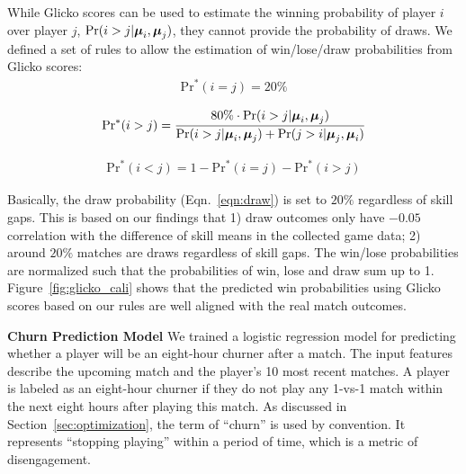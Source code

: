 
While Glicko scores can be used to estimate the winning probability of player $i$ over player $j$, $\Pr(i > j | \boldsymbol{\mu}_i, \boldsymbol{\mu}_j)$, they cannot provide the probability of draws. We defined a set of rules to allow the estimation of win/lose/draw probabilities from Glicko scores:
\begin{align}\label{eqn:draw}
\text{Pr}^*(i=j) = 20\%
\end{align}

\begin{align}
\text{Pr}^*(i>j)  = \frac{80\% \cdot \Pr(i > j | \boldsymbol{\mu}_i, \boldsymbol{\mu}_j)}{\Pr(i > j | \boldsymbol{\mu}_i, \boldsymbol{\mu}_j) + \Pr(j > i | \boldsymbol{\mu}_j, \boldsymbol{\mu}_i) }
\end{align}

\begin{align}
\text{Pr}^*(i<j) = 1 - \text{Pr}^*(i=j) - \text{Pr}^*(i>j)
\end{align}

Basically, the draw probability (Eqn.~\ref{eqn:draw}) is set to $20\%$ regardless of skill gaps. This is based on our findings that 1) draw outcomes only have $-0.05$ correlation with the difference of skill means in the collected game data; 2) around $20\%$ matches are draws regardless of skill gaps. The win/lose probabilities are normalized such that the probabilities of win, lose and draw sum up to 1. Figure~\ref{fig:glicko_cali} shows that the predicted win probabilities using Glicko scores based on our rules are well aligned with the real match outcomes.

\textbf{Churn Prediction Model} We trained a logistic regression model for predicting whether a player will be an eight-hour churner after a match. The input features describe the upcoming match and the player's 10 most recent matches. A player is labeled as an eight-hour churner if they do not play any 1-vs-1 match within the next eight hours after playing this match. As discussed in Section~\ref{sec:optimization}, the term of ``churn'' is used by convention. It represents ``stopping playing'' within a period of time, which is a metric of disengagement.

